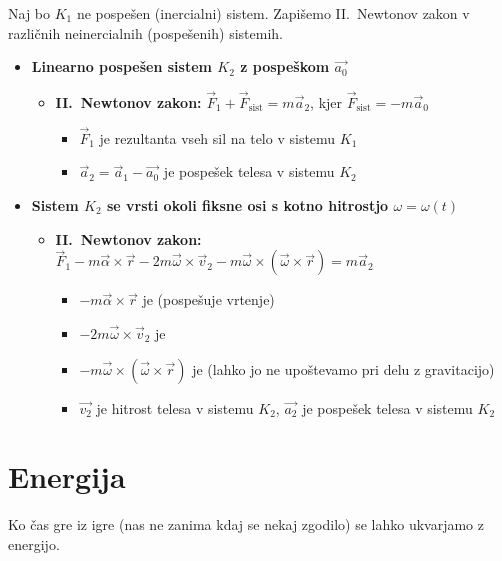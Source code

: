 Naj bo \(K_1\) ne pospešen (inercialni) sistem. Zapišemo II.\ Newtonov zakon v različnih neinercialnih (pospešenih) sistemih.
\begin{itemize}
    \item \textbf{Linearno pospešen sistem \(K_2\) z pospeškom \(\vec{a_0}\)} 
   
   \begin{itemize}
    \item \textbf{II.\ Newtonov zakon:} \(\boxed{\vec{F}_1 + \vec{F}_\text{sist} = m \vec{a}_2}\), kjer \(\vec{F}_\text{sist} = - m \vec{a}_0\)
     \begin{itemize}
         \item \(\vec{F}_1\) je rezultanta vseh sil na telo v sistemu \(K_1\)
         \item \(\vec{a}_2 = \vec{a}_1 - \vec{a_0}\) je pospešek telesa v sistemu \(K_2\)
     \end{itemize}
   \end{itemize}
    \item \textbf{Sistem \(K_2\) se vrsti okoli fiksne osi s kotno hitrostjo \(\omega = \omega(t)\)}
    \begin{itemize}
        \item \textbf{II.\ Newtonov zakon:} \(\boxed{\vec{F}_1 - m \vec{\alpha} \times \vec{r} - 2m \vec{\omega} \times \vec{v}_2 - m \vec{\omega} \times (\vec{\omega} \times \vec{r}) = m \vec{a}_2}\)
        \begin{itemize}
            \item \(-m \vec{\alpha} \times \vec{r}\) je  (pospešuje vrtenje)
            \item \(-2m \vec{\omega} \times \vec{v}_2\) je 
            \item \(-m \vec{\omega} \times (\vec{\omega} \times \vec{r})\) je  (lahko jo ne upoštevamo pri delu z gravitacijo)
            \item \(\vec{v_2}\) je hitrost telesa v sistemu \(K_2\), \(\vec{a_2}\) je pospešek telesa v sistemu \(K_2\)
        \end{itemize}
    \end{itemize}
\end{itemize}

\newpage
\section{Energija}
Ko čas gre iz igre (nas ne zanima kdaj se nekaj zgodilo) se lahko ukvarjamo z energijo.
